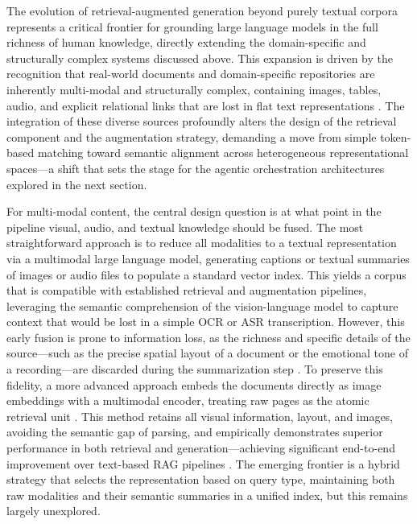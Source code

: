 \documentclass[11pt,a4paper]{article}
\begin{document}
The evolution of retrieval-augmented generation beyond purely textual corpora represents a critical frontier for grounding large language models in the full richness of human knowledge, directly extending the domain-specific and structurally complex systems discussed above. This expansion is driven by the recognition that real-world documents and domain-specific repositories are inherently multi-modal and structurally complex, containing images, tables, audio, and explicit relational links that are lost in flat text representations \cite{arxiv:2405.06211v3}. The integration of these diverse sources profoundly alters the design of the retrieval component and the augmentation strategy, demanding a move from simple token-based matching toward semantic alignment across heterogeneous representational spaces---a shift that sets the stage for the agentic orchestration architectures explored in the next section.

For multi-modal content, the central design question is at what point in the pipeline visual, audio, and textual knowledge should be fused. The most straightforward approach is to reduce all modalities to a textual representation via a multimodal large language model, generating captions or textual summaries of images or audio files to populate a standard vector index. This yields a corpus that is compatible with established retrieval and augmentation pipelines, leveraging the semantic comprehension of the vision-language model to capture context that would be lost in a simple OCR or ASR transcription. However, this early fusion is prone to information loss, as the richness and specific details of the source---such as the precise spatial layout of a document or the emotional tone of a recording---are discarded during the summarization step \cite{arxiv:2410.10594v2}. To preserve this fidelity, a more advanced approach embeds the documents directly as image embeddings with a multimodal encoder, treating raw pages as the atomic retrieval unit \cite{arxiv:2502.11371v3}. This method retains all visual information, layout, and images, avoiding the semantic gap of parsing, and empirically demonstrates superior performance in both retrieval and generation---achieving significant end-to-end improvement over text-based RAG pipelines \cite{arxiv:2502.11371v3}. The emerging frontier is a hybrid strategy that selects the representation based on query type, maintaining both raw modalities and their semantic summaries in a unified index, but this remains largely unexplored.
\end{document}
